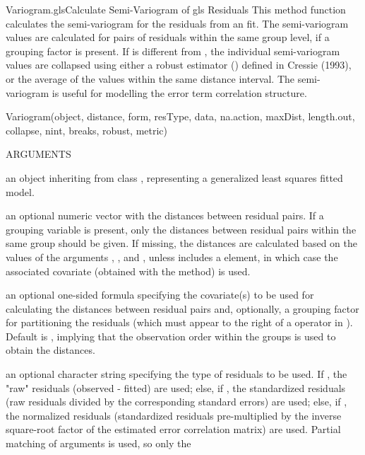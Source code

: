 \documentclass[pdftex]{article} \usepackage{url,graphicx}
\renewcommand{\Twiddle}{\mbox{\(\sim\)}}
\begin{document}
\begin{Helpfile}{Variogram.gls}{Calculate Semi-Variogram of gls Residuals}
  This method function calculates the semi-variogram for the residuals
  from an  fit. The semi-variogram values are calculated for
  pairs of residuals within the same group level, if a grouping factor
  is present. If  is different from , the
  individual semi-variogram values are collapsed using either a robust
  estimator () defined in Cressie (1993), or the
  average of the values within the same distance interval. The
  semi-variogram is useful for modelling the error term correlation
  structure.
\begin{Example}
Variogram(object, distance, form, resType, data, na.action, maxDist,
          length.out, collapse, nint, breaks, robust, metric)
\end{Example}
\begin{Argument}{ARGUMENTS}
\item[\Co{object:}]
an object inheriting from class , representing
a generalized least squares fitted model.
\item[\Co{distance:}]
an optional numeric vector with the distances between
residual pairs. If a grouping variable is present, only the
distances between residual pairs within the same group should be
given. If missing, the distances are calculated based on the
values of the arguments , , and
, unless  includes a 
element, in which case the associated covariate (obtained with the
 method) is used.
\item[\Co{form:}]
an optional one-sided formula specifying the covariate(s)
to be used for calculating the distances between residual pairs and,
optionally, a grouping factor for partitioning the residuals (which
must appear to the right of a \Co{|} operator in
). Default is \Co{{\Twiddle}1}, implying that the observation 
order within the groups is used to obtain the distances.
\item[\Co{resType:}]
an optional character string specifying the type of
residuals to be used. If , the "raw" residuals
(observed - fitted) are used; else, if , the
standardized residuals (raw residuals divided by the corresponding
standard errors) are used; else, if , the
normalized residuals (standardized residuals pre-multiplied by the
inverse square-root factor of the estimated error correlation
matrix) are used. Partial matching of arguments is used, so only the

\end{Argument}
\end{Helpfile}
\end{document}
